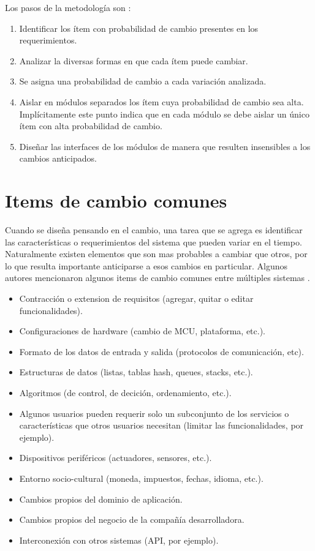Los pasos de la metodología son \cite{Parnas02, cristia2022diseno}:

\begin{enumerate}
	\item Identificar los ítem con probabilidad de cambio presentes en los requerimientos.
	\item Analizar la diversas formas en que cada ítem puede cambiar.
	\item Se asigna una probabilidad de cambio a cada variación analizada.
	\item Aislar en módulos separados los ítem cuya probabilidad de cambio sea alta. Implícitamente este punto indica que en cada módulo se debe aislar un único ítem con alta probabilidad de cambio.
	\item Diseñar las interfaces de los módulos de manera que resulten insensibles a los cambios anticipados.

\end{enumerate}


\section{Items de cambio comunes}
\label{listaItems}

Cuando se diseña pensando en el cambio, una tarea que se agrega es identificar las características o requerimientos del sistema que pueden variar en el tiempo. Naturalmente existen elementos que son mas probables a cambiar que otros, por lo que resulta importante anticiparse a esos cambios en particular. Algunos autores mencionaron algunos items de cambio comunes entre múltiples sistemas \cite{Parnas02, cristia2022diseno}.

\begin{itemize}
	\item Contracción o extension de requisitos (agregar, quitar o editar funcionalidades).
	\item Configuraciones de hardware (cambio de \gls{MCU}, plataforma, etc.).
	\item Formato de los datos de entrada y salida (protocolos de comunicación, etc).
	\item Estructuras de datos (listas, tablas hash, queues, stacks, etc.).
	\item Algoritmos (de control, de decición, ordenamiento, etc.).
	\item Algunos usuarios pueden requerir solo un subconjunto de los servicios o características que otros usuarios necesitan (limitar las funcionalidades, por ejemplo).
	\item Dispositivos periféricos (actuadores, sensores, etc.).
	\item Entorno socio-cultural (moneda, impuestos, fechas, idioma, etc.).
	\item Cambios propios del dominio de aplicación.
	\item Cambios propios del negocio de la compañía desarrolladora.
	\item Interconexión con otros sistemas (\gls{API}, por ejemplo).
\end{itemize}

